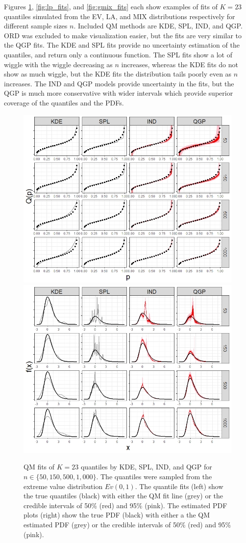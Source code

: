 \documentclass[preprint,12pt,authoryear]{elsarticle}
\begin{document}
Figures \ref{fig:evd_fits}, \ref{fig:lp_fits},  and \ref{fig:gmix_fits} each show examples of fits of $K=23$ quantiles simulated from the EV, LA, and MIX distributions respectively for different sample sizes $n$. Included QM methods are KDE, SPL, IND, and QGP. ORD was excluded to make visualization easier, but the fits are very similar to the QGP fits. The KDE and SPL fits provide no uncertainty estimation of the quantiles, and return only a continuous function. The SPL fits show a lot of wiggle with the wiggle decreasing as $n$ increases, whereas the KDE fits do not show as much wiggle, but the KDE fits the distribution tails poorly even as $n$ increases. The IND and QGP models provide uncertainty in the fits, but the QGP is much more conservative with wider intervals which provide superior coverage of the quantiles and the PDFs. 







\begin{figure}[hbt!]
\centering
  \centering
  \includegraphics[width=.49\linewidth]{Images/quants_evd.png}
  \centering
  \includegraphics[width=.49\linewidth]{Images/dens_evd.png}
\caption{QM fits of $K=23$ quantiles by KDE, SPL, IND, and QGP for $n \in \{50, 150, 500, 1{,}000\}$. The quantiles were sampled from the extreme value distribution $Ev(0,1)$. The quantile fits (left) show the true quantiles (black) with either the QM fit line (grey) or the credible intervals of 50\% (red) and 95\% (pink). 
The estimated PDF plots (right) show the true PDF (black) with either a the QM estimated PDF (grey) or the credible intervals of 50\% (red) and 95\% (pink).}
\label{fig:evd_fits}
\end{figure}
\end{document}
